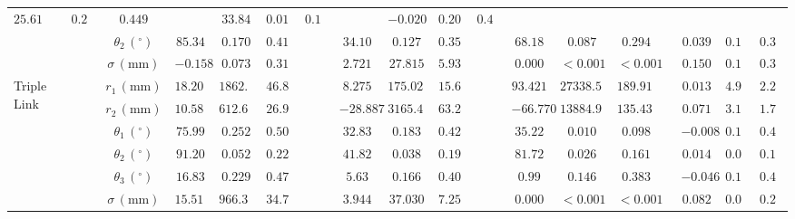 \documentclass{article}
\begin{document}
\begin{table}
{\begin{tabular}{ll cccc cccc cccc cccc}
                                    $25.61$ & $0.202$ & $0.449$ &&
                                    $33.84$ & $0.010$ & $0.102$ &&
                                    $-0.020$ & $0.202$ & $0.451$\\
                                && $\theta_2\, (^{\circ})$ & $85.34$ & $0.170$ & $0.413$ &&
                                    $34.10$ & $0.127$ & $0.356$ &&
                                    $68.18$ & $0.087$ & $0.294$ &&
                                    $0.039$ & $0.127$ & $0.358$\\
                                && $\sigma\, (\si{\milli\meter})$ & $-0.158$ & $0.073$ & $0.314$ &&
                                    $2.721$ & $27.815$ & $5.935$ &&
                                    $0.000$ & $<0.001$ & $<0.001$ &&
                                    $0.150$ & $0.104$ & $0.355$\\
  \hline
  \multirow{6}{*}{Triple Link}  && $r_1\, (\si{\milli\meter})$ & $18.202$ & $1862.157$ & $46.834$ &&
                                    $8.275$ & $175.028$ & $15.605$ &&
                                    $93.421$ & $27338.532$ & $189.911$ &&
                                     $0.013$ & $4.976$ & $2.231$\\
                                && $r_2\, (\si{\milli\meter})$ & $10.584$ & $612.644$ & $26.920$ &&
                                    $-28.887$ & $3165.409$ & $63.244$ &&
                                     $-66.770$ & $13884.938$ & $135.437$ &&
                                     $0.071$ & $3.185$ & $1.786$ \\
                                && $\theta_1\, (^{\circ})$ & $75.99$ & $0.252$ & $0.502$ &&
                                    $32.83$ & $0.183$ & $0.428$ &&
                                    $35.22$ & $0.010$ & $0.098$ &&
                                    $-0.008$ & $0.183$ & $0.429$ \\
                                && $\theta_2\, (^{\circ})$ & $91.20$ & $0.052$ & $0.227$ &&
                                    $41.82$ & $0.038$ & $0.196$ &&
                                    $81.72$ & $0.026$ & $0.161$ &&
                                    $0.014$ & $0.039$ & $0.197$ \\
                                && $\theta_3\, (^{\circ})$ & $16.83$ & $0.229$ & $0.479$ &&
                                    $5.63$ & $0.166$ & $0.408$ &&
                                    $0.99$ & $0.146$ & $0.383$ &&
                                    $-0.046$ & $0.166$ & $0.408$ \\
                                && $\sigma\, (\si{\milli\meter})$ & $15.512$ & $966.393$ & $34.716$ &&
                                    $3.944$ & $37.030$ & $7.252$ &&
                                    $0.000$ & $<0.001$ & $<0.001$ &&
                                    $0.082$ & $0.065$ & $0.267$ \\
  \hline
\end{tabular}

}
\end{table}
\end{document}
